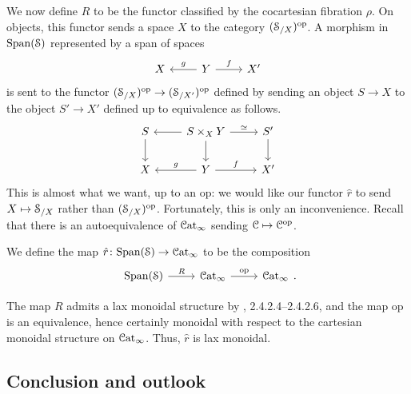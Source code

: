 \documentclass[main.tex]{subfiles}
\begin{document}
We now define $R$ to be the functor classified by the cocartesian fibration $\rho$. On objects, this functor sends a space $X$ to the category $(\S_{/X})\op$. A morphism in $\Span(\S)$ represented by a span of spaces
\begin{equation*}
  \begin{tikzcd}
    X
    & Y
    \arrow[l, swap, "g"]
    \arrow[r, "f"]
    & X'
  \end{tikzcd}
\end{equation*}
is sent to the functor $(\S_{/X})\op \to (\S_{/X'})\op$ defined by sending an object $S \to X$ to the object $S' \to X'$ defined up to equivalence as follows.
\begin{equation*}
  \begin{tikzcd}
    S
    \arrow[d]
    & S \times_{X} Y
    \arrow[l]
    \arrow[r, "\simeq"]
    \arrow[d]
    & S'
    \arrow[d]
    \\
    X
    & Y
    \arrow[l, swap, "g"]
    \arrow[r, "f"]
    & X'
  \end{tikzcd}
\end{equation*}
This is almost what we want, up to an $\mathrm{op}$: we would like our functor $\hat{r}$ to send $X \mapsto \S_{/X}$ rather than $(\S_{/X})\op$. Fortunately, this is only an inconvenience. Recall that there is an autoequivalence of $\ICat$ sending $\category{C} \mapsto \category{C}\op$.
\begin{definition}
  We define the map $\hat{r}\colon \Span(\S) \to \ICat$ to be the composition
  \begin{equation*}
    \begin{tikzcd}
      \Span(\S)
      \arrow[r, "R"]
      & \ICat
      \arrow[r, "\mathrm{op}"]
      & \ICat
    \end{tikzcd}.
  \end{equation*}
\end{definition}

The map $R$ admits a lax monoidal structure by \cite{luriehigheralgebra}, 2.4.2.4--2.4.2.6, and the map $\mathrm{op}$ is an equivalence, hence certainly monoidal with respect to the cartesian monoidal structure on $\ICat$. Thus, $\hat{r}$ is lax monoidal.

\subsection{Conclusion and outlook}
\label{ssc:conclusion}
\end{document}
